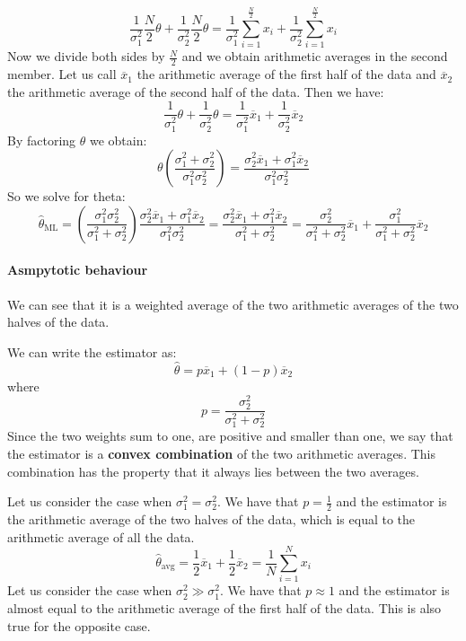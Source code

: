 \[
    \frac{1}{\sigma_1^2} \frac{N}{2} \theta + \frac{1}{\sigma_2^2} \frac{N}{2} \theta = \frac{1}{\sigma_1^2} \sum_{i=1}^{\frac{N}{2}} x_i + \frac{1}{\sigma_2^2} \sum_{i=1}^{\frac{N}{2}} x_i
\]
Now we divide both sides by $\frac{N}{2}$ and we obtain arithmetic averages in the second member. Let us call $\overline{x}_1$ the arithmetic average of the first half of the data and $\overline{x}_2$ the arithmetic average of the second half of the data. Then we have:
\[
    \frac{1}{\sigma_1^2} \theta + \frac{1}{\sigma_2^2} \theta = \frac{1}{\sigma_1^2} \overline{x}_1 + \frac{1}{\sigma_2^2} \overline{x}_2
\]
By factoring $\theta$ we obtain:
\[
    \theta \left(\frac{\sigma_1^2 + \sigma_2^2}{\sigma_1^2\sigma_2^2}\right) = \frac{\sigma_2^2\overline{x}_1 + \sigma_1^2\overline{x}_2}{\sigma_1^2 \sigma_2^2}
\]
So we solve for theta:
\[
    \hat{\theta}_{\text{ML}} = \left(\frac{\sigma_1^2\sigma_2^2}{\sigma_1^2 + \sigma_2^2}\right) \frac{\sigma_2^2\overline{x}_1 + \sigma_1^2\overline{x}_2}{\sigma_1^2 \sigma_2^2} = \frac{\sigma_2^2\overline{x}_1 + \sigma_1^2\overline{x}_2}{\sigma_1^2 + \sigma_2^2} = \frac{\sigma_2^2}{\sigma_1^2 + \sigma_2^2} \overline{x}_1 + \frac{\sigma_1^2}{\sigma_1^2 + \sigma_2^2} \overline{x}_2
\]
\paragraph*{Asmpytotic behaviour}
We can see that it is a weighted average of the two arithmetic averages of the two halves of the data.

We can write the estimator as:
\[
    \hat{\theta} = p \overline{x}_1 + (1 - p) \overline{x}_2
\]
where
\[
    p = \frac{\sigma_2^2}{\sigma_1^2 + \sigma_2^2}
\]
Since the two weights sum to one, are positive and smaller than one, we say that the estimator is a \textbf{convex combination} of the two arithmetic averages. This combination has the property that it always lies between the two averages.

Let us consider the case when $\sigma_1^2 = \sigma_2^2$. We have that $p = \frac{1}{2}$ and the estimator is the arithmetic average of the two halves of the data, which is equal to the arithmetic average of all the data.
\[
    \hat{\theta}_{\text{avg}} = \frac{1}{2} \overline{x}_1 + \frac{1}{2} \overline{x}_2 = \frac{1}{N} \sum_{i=1}^{N} x_i
\]
Let us consider the case when $\sigma_2^2 \gg \sigma_1^2$. We have that $p \approx 1$ and the estimator is almost equal to the arithmetic average of the first half of the data. This is also true for the opposite case.


